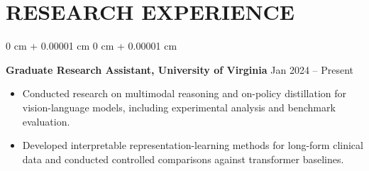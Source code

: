 \documentclass[10pt, letterpaper]{article}
\newenvironment{highlights}{
    \begin{itemize}[
        topsep=0.10 cm,
        parsep=0.10 cm,
        partopsep=0pt,
        itemsep=0pt,
        leftmargin=0 cm + 10pt
    ]
}{
    \end{itemize}
} %
\newenvironment{onecolentry}{
    \begin{adjustwidth}{
        0 cm + 0.00001 cm
    }{
        0 cm + 0.00001 cm
    }
}{
    \end{adjustwidth}
} %
\begin{document}
\section{RESEARCH EXPERIENCE}
\begin{onecolentry}
\textbf{Graduate Research Assistant, University of Virginia} \hfill Jan 2024 -- Present
\begin{highlights}
\item Conducted research on multimodal reasoning and on-policy distillation for vision-language models, including experimental analysis and benchmark evaluation.
\item Developed interpretable representation-learning methods for long-form clinical data and conducted controlled comparisons against transformer baselines.
\end{highlights}
\end{onecolentry}
\end{document}
